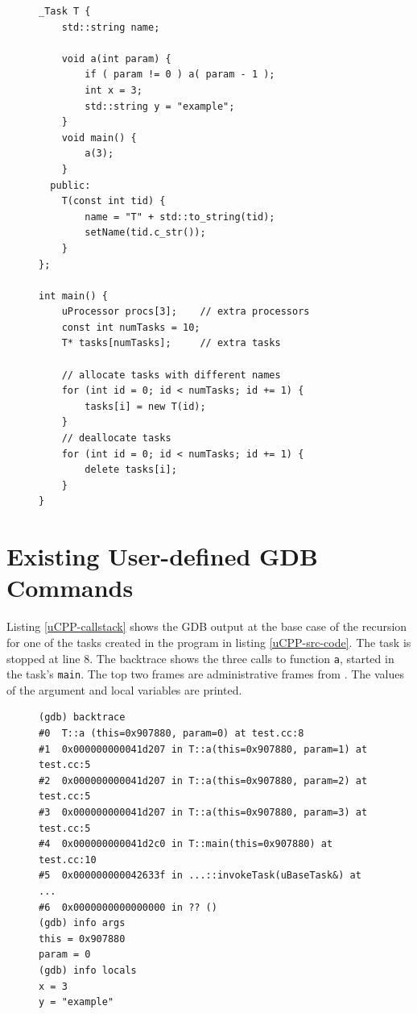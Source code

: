 \begin{figure}
\begin{lstlisting}[style=C++, caption={\uCPPS source code used for GDB commands},
label={uCPP-src-code}, basicstyle=\small]
_Task T {
    std::string name;

    void a(int param) {
        if ( param != 0 ) a( param - 1 );
        int x = 3;
        std::string y = "example";
    }
    void main() {
        a(3);
    }
  public:
    T(const int tid) {
        name = "T" + std::to_string(tid);
        setName(tid.c_str());
    }
};

int main() {
    uProcessor procs[3];	// extra processors
    const int numTasks = 10;
    T* tasks[numTasks];		// extra tasks

    // allocate tasks with different names
    for (int id = 0; id < numTasks; id += 1) {
        tasks[i] = new T(id);
    }
    // deallocate tasks
    for (int id = 0; id < numTasks; id += 1) {
        delete tasks[i];
    }
}
\end{lstlisting}
\end{figure}

\section{Existing User-defined GDB Commands}
Listing \ref{uCPP-callstack} shows the GDB output at the base case of the
recursion for one of the tasks created in the \uCPPS program in listing
\ref{uCPP-src-code}.  The task is stopped at line 8. The backtrace shows the
three calls to function \verb|a|, started in the task's \verb|main|. The top
two frames are administrative frames from \uCPP. The values of the argument and
local variables are printed.

\begin{figure}
\begin{lstlisting}[caption={Call stack of function \texttt{a} in the \uCPPS
program from listing \ref{uCPP-src-code}}, label={uCPP-callstack}, basicstyle=\small\tt]
(gdb) backtrace
#0  T::a (this=0x907880, param=0) at test.cc:8
#1  0x000000000041d207 in T::a(this=0x907880, param=1) at test.cc:5
#2  0x000000000041d207 in T::a(this=0x907880, param=2) at test.cc:5
#3  0x000000000041d207 in T::a(this=0x907880, param=3) at test.cc:5
#4  0x000000000041d2c0 in T::main(this=0x907880) at test.cc:10
#5  0x000000000042633f in ...::invokeTask(uBaseTask&) at ...
#6  0x0000000000000000 in ?? ()
(gdb) info args
this = 0x907880
param = 0
(gdb) info locals
x = 3
y = "example"
\end{lstlisting}
\end{figure}

